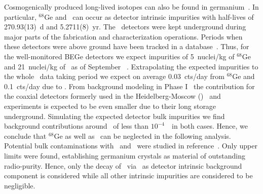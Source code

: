 Cosmogenically produced long-lived isotopes can also be found in
germanium~\cite{Meierhofer2009, Meierhofer2010, Meierhofer2012}. In particular, $^{68}$Ge
and \Co\ can occur as detector intrinsic impurities with half-lives of 270.93(13)~d and
5.2711(8)~yr.  The \bege\ detectors were kept underground during major parts of the
fabrication and characterization operations. Periods when these detectors were above
ground have been tracked in a database~\cite{Agostini2015e}.  Thus, for the well-monitored
BEGe detectors we expect impurities of 5~nuclei/kg of $^{68}$Ge and 21~nuclei/kg of \Co\
as of September ~\cite{Agostini2015e}. Extrapolating the expected impurities to the
whole \phasetwo\ data taking period we expect on average 0.03~cts/day from $^{68}$Ge and
0.1~cts/day due to \Co. From background modeling in Phase I~\cite{Agostini2013a} the
contribution for the coaxial detectors formerly used in the Heidelberg-Moscow
(\hdm)~\cite{Klapdor2001} and \igex~\cite{Aalseth2002} experiments is expected to be even
smaller due to their long storage underground. Simulating the expected detector bulk
impurities we find background contributions around \qbb\ of less than $10^{-4}$~\ctsper\
in both cases. Hence, we conclude that $^{68}$Ge as well as \Co\ can be neglected in the
following analysis. Potential bulk contaminations with \Uh\ and \Thh\ were studied in
reference~\cite{Agostini2016a}. Only upper limits were found, establishing germanium
crystals as material of outstanding radio-purity.  Hence, only the decay of \gesix\ via
\nnbb\ as detector intrinsic background component is considered while all other intrinsic
impurities are considered to be negligible.

